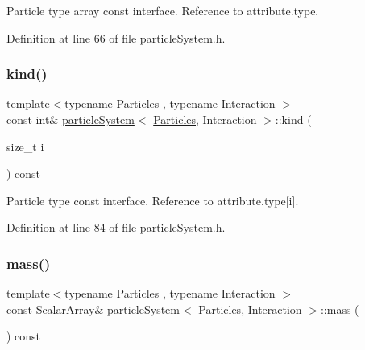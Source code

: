 Particle type array const interface. Reference to attribute.\+type. 



Definition at line 66 of file particle\+System.\+h.

\mbox{\label{classparticle_system_ad406c7bb71f92b27d918b0b36c0f9e93}} 
\subsubsection{\texorpdfstring{kind()}{kind()}\hspace{0.1cm}{\footnotesize\ttfamily [2/2]}}
{\footnotesize\ttfamily template$<$typename Particles , typename Interaction $>$ \\
const int\& \mbox{\hyperlink{classparticle_system}{particle\+System}}$<$ \mbox{\hyperlink{struct_particles}{Particles}}, Interaction $>$\+::kind (\begin{DoxyParamCaption}\item[{size\+\_\+t}]{i }\end{DoxyParamCaption}) const\hspace{0.3cm}{\ttfamily [inline]}}



Particle type const interface. Reference to attribute.\+type\mbox{[}i\mbox{]}. 



Definition at line 84 of file particle\+System.\+h.

\mbox{\label{classparticle_system_a8adc16a716e231f9840dd7f7e063f656}} 
\subsubsection{\texorpdfstring{mass()}{mass()}\hspace{0.1cm}{\footnotesize\ttfamily [1/2]}}
{\footnotesize\ttfamily template$<$typename Particles , typename Interaction $>$ \\
const \mbox{\hyperlink{classparticle_system_a7f143d2466bd0f78d79cccd3493a756b}{Scalar\+Array}}\& \mbox{\hyperlink{classparticle_system}{particle\+System}}$<$ \mbox{\hyperlink{struct_particles}{Particles}}, Interaction $>$\+::mass (\begin{DoxyParamCaption}{ }\end{DoxyParamCaption}) const\hspace{0.3cm}{\ttfamily [inline]}}



